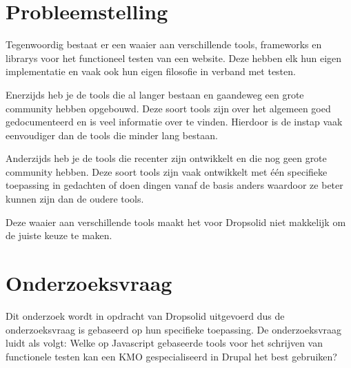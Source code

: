 \section{Probleemstelling}
\label{sec:probleemstelling}
Tegenwoordig bestaat er een waaier aan verschillende \glspl{tool}, \glspl{framework} en \glspl{library} voor het functioneel testen van een website. Deze hebben elk hun eigen implementatie en vaak ook hun eigen filosofie in verband met testen. 

Enerzijds heb je de tools die al langer bestaan en gaandeweg een grote community hebben opgebouwd. Deze soort tools zijn over het algemeen goed gedocumenteerd en is veel informatie over te vinden. Hierdoor is de instap vaak eenvoudiger dan de tools die minder lang bestaan.

Anderzijds heb je de tools die recenter zijn ontwikkelt en die nog geen grote community hebben. Deze soort tools zijn  vaak ontwikkelt met één specifieke toepassing in gedachten of doen dingen vanaf de basis anders waardoor ze beter kunnen zijn dan de oudere tools. 

Deze waaier aan verschillende tools maakt het voor Dropsolid niet makkelijk om de juiste keuze te maken.



\section{Onderzoeksvraag}
\label{sec:onderzoeksvraag}
Dit onderzoek wordt in opdracht van Dropsolid uitgevoerd dus de onderzoeksvraag is gebaseerd op hun specifieke toepassing. De onderzoeksvraag luidt als volgt: Welke op Javascript gebaseerde tools voor het schrijven van functionele testen kan een KMO gespecialiseerd in Drupal het best gebruiken?


